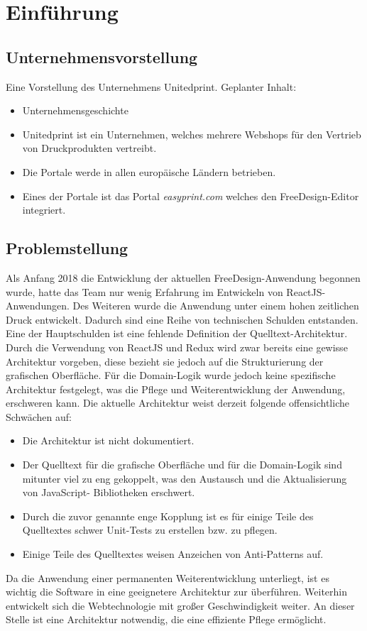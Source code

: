 \chapter{Einführung} 
\section{Unternehmensvorstellung} 
Eine Vorstellung des Unternehmens Unitedprint.
Geplanter Inhalt:
\begin{itemize}
    \item Unternehmensgeschichte
    \item Unitedprint ist ein Unternehmen, welches mehrere Webshops für den Vertrieb von Druckprodukten vertreibt. 
    \item Die Portale werde in allen europäische Ländern betrieben. 
    \item Eines der Portale ist das Portal \emph{easyprint.com} welches den FreeDesign-Editor integriert.
\end{itemize}



% 

\section{Problemstellung}
Als Anfang 2018 die Entwicklung der aktuellen FreeDesign-Anwendung begonnen wurde, hatte das Team nur wenig Erfahrung im Entwickeln von ReactJS-Anwendungen. Des Weiteren wurde die Anwendung unter einem hohen zeitlichen Druck entwickelt.
Dadurch sind eine Reihe von technischen Schulden entstanden. Eine der Hauptschulden ist eine fehlende Definition der Quelltext-Architektur. Durch die Verwendung von ReactJS und Redux wird zwar bereits eine gewisse Architektur vorgeben, diese bezieht sie jedoch auf die Strukturierung der grafischen Oberfläche. Für die Domain-Logik wurde jedoch keine spezifische Architektur festgelegt, was die Pflege und Weiterentwicklung der Anwendung, erschweren kann.
Die aktuelle Architektur weist derzeit folgende offensichtliche Schwächen auf:
\begin{itemize}
  \item Die Architektur ist nicht dokumentiert.
  \item Der Quelltext für die grafische Oberfläche und für die Domain-Logik sind mitunter viel
  zu eng gekoppelt, was den Austausch und die Aktualisierung von JavaScript-
  Bibliotheken erschwert.
  \item Durch die zuvor genannte enge Kopplung ist es für einige Teile des Quelltextes
  schwer Unit-Tests zu erstellen bzw. zu pflegen.
  \item Einige Teile des Quelltextes weisen Anzeichen von Anti-Patterns auf.
\end{itemize}
Da die Anwendung einer permanenten Weiterentwicklung unterliegt, ist es wichtig die Software in eine geeignetere Architektur zur überführen. Weiterhin entwickelt sich die Webtechnologie mit großer Geschwindigkeit weiter. An dieser Stelle ist eine Architektur notwendig, die eine effiziente Pflege ermöglicht.

